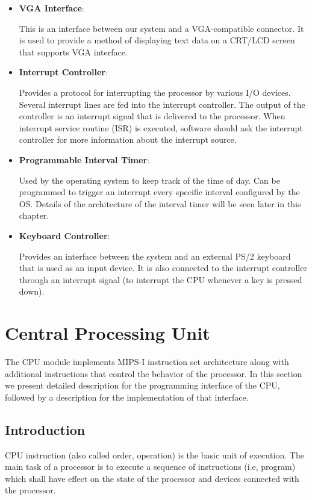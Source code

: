 \documentclass[oneside]{book}
\begin{document}
\begin{itemize}
\item \textbf{VGA Interface}:

This is an interface between our system and a VGA-compatible connector.
It is used to provide a method of displaying text data on a CRT/LCD screen
that supports VGA interface.

\item \textbf{Interrupt Controller}:

Provides a protocol for interrupting the processor by various I/O devices.
Several interrupt lines are fed into the interrupt controller. The output
of the controller is an interrupt signal that is delivered to the processor.
When interrupt service routine (ISR) is executed, software should ask
the interrupt controller for more information about the interrupt source.

\item \textbf{Programmable Interval Timer}:

Used by the operating system to keep track of the time of day. Can be
programmed to trigger an interrupt every specific interval configured
by the OS. Details of the architecture of the interval timer will be 
seen later in this chapter.

\item \textbf{Keyboard Controller}:

Provides an interface between the system and an external PS/2 keyboard
that is used as an input device. It is also connected to the interrupt
controller through an interrupt signal (to interrupt the CPU whenever
a key is pressed down).

\end{itemize}

\section{Central Processing Unit}

The CPU module implements MIPS-I instruction set architecture along with
additional instructions that control the behavior of the processor. In this
section we present detailed description for the programming interface
of the CPU, followed by a description for the implementation of that
interface.

\subsection{Introduction}

CPU instruction (also called order, operation) is the basic unit
of execution. The main task of a processor is to execute a sequence
of instructions (i.e, program) which shall have effect on the state
of the processor and devices connected with the processor.\\
\end{document}
